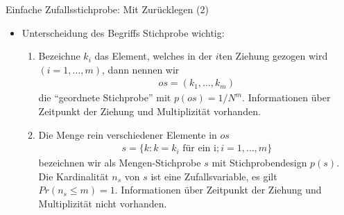 \documentclass[9pt]{beamer}
\begin{document}
\begin{frame}{Einfache Zufallsstichprobe: Mit Zurücklegen (2)}
\begin{itemize}
\item Unterscheidung des Begriffs Stichprobe wichtig:
\begin{enumerate}
	\item Bezeichne $k_i$ das Element, welches in der $i$ten Ziehung gezogen wird $(i=1,\dots,m)$, dann nennen wir
	\begin{align*}
	os = (k_1,\dots,k_m)
	\end{align*}
	die \enquote{geordnete Stichprobe} mit $p(os)= 1/N^m$. Informationen über Zeitpunkt der Ziehung und Multiplizität vorhanden. 
	\item Die Menge rein verschiedener Elemente in $os$
	\begin{align*}
	s = \{k:k=k_i \text{ für ein i};i=1,\dots,m\}
	\end{align*}
	bezeichnen wir als Mengen-Stichprobe $s$ mit Stichprobendesign $p(s)$. Die Kardinalität $n_s$ von $s$ ist eine Zufallsvariable, es gilt $Pr(n_s \leq m)=1$. Informationen über Zeitpunkt der Ziehung und Multiplizität nicht vorhanden.
\end{enumerate}

\end{itemize}
\end{frame}
\end{document}

